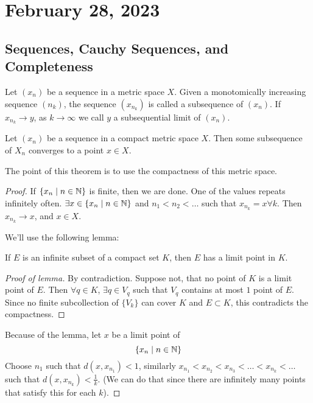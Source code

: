 \section{February 28, 2023}
\subsection{Sequences, Cauchy Sequences, and Completeness}
\begin{definition}
    Let $(x_n)$ be a sequence in a metric space $X$. Given a monotomically increasing sequence $(n_k)$, the sequence $(x_{n_k})$ is called a subsequence of $(x_n)$. If $x_{n_k}\to y$, as $k\to \infty$ we call $y$ a subsequential limit of $(x_n)$.
\end{definition}
\begin{theorem}
    Let $(x_n)$ be a sequence in a compact metric space $X$. Then some subsequence of $X_n$ converges to a point $x\in X$.
\end{theorem}
The point of this theorem is to use the compactness of this metric space.
\begin{proof}
    If $\{x_n\mid n\in\mathbb N\}$ is finite, then we are done. One of the values repeats infinitely often. $\exists x\in \{x_n \mid n\in\mathbb N\}$ and $n_1 < n_2 < \dots$ such that $x_{n_k}= x\forall k$. Then $x_{n_k}\to x$, and $x\in X$.

    We'll use the following lemma:
    \begin{lemma}
        If $E$ is an infinite subset of a compact set $K$, then $E$ has a limit point in $K$.
    \end{lemma}
    \begin{proof}[Proof of lemma]
        By contradiction. Suppose not, that no point of $K$ is a limit point of $E$. Then $\forall q\in K$, $\exists q\in V_q$ such that $V_q$ contains at most $1$ point of $E$. Since no finite subcollection of $\{V_k\}$ can cover $K$ and $E\subset K$, this contradicts the compactness.
    \end{proof}

    Because of the lemma, let $x$ be a limit point of
    \[\{x_n\mid n\in \mathbb N\}\]
    Choose $n_1$ such that $d(x, x_{n_1}) < 1$, similarly $x_{n_1} < x_{n_2} < x_{n_3} < \dots < x_{n_k} < \dots$ such that $d(x, x_{n_k}) < \frac{1}{k}$. (We can do that since there are infinitely many points that satisfy this for each $k$).
\end{proof}

